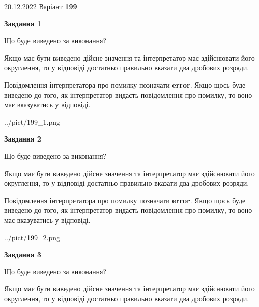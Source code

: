 \documentclass[12pt, ukrainian]{article}
\begin{document}
{20.12.2022 Варіант \No \textbf { 199 }\par}
{
\begin {Large}

{\begin {center}\textbf{Завдання 1}\end {center}}\par
Що буде виведено за виконання? \par

Якщо має бути виведено дійсне значення та інтерпретатор має здійснювати його округлення, 
то у відповіді достатньо правильно вказати два дробових розряди.

Повідомлення інтерпретатора про помилку позначати \textbf{error}.
Якщо щось буде виведено до того, як інтерпретатор видасть повідомлення про помилку, 
то воно має вказуватись у відповіді. \par

\begin{center}
	{../pict/199_1.png}
\end{center}
\newpage

{\begin {center}\textbf{Завдання 2}\end {center}}\par
Що буде виведено за виконання? \par

Якщо має бути виведено дійсне значення та інтерпретатор має здійснювати його округлення, 
то у відповіді достатньо правильно вказати два дробових розряди.

Повідомлення інтерпретатора про помилку позначати \textbf{error}.
Якщо щось буде виведено до того, як інтерпретатор видасть повідомлення про помилку, 
то воно має вказуватись у відповіді. \par

\begin{center}
	{../pict/199_2.png}
\end{center}
\newpage

{\begin {center}\textbf{Завдання 3}\end {center}}\par
Що буде виведено за виконання? \par

Якщо має бути виведено дійсне значення та інтерпретатор має здійснювати його округлення, 
то у відповіді достатньо правильно вказати два дробових розряди.


\end{Large}}
\end{document}
